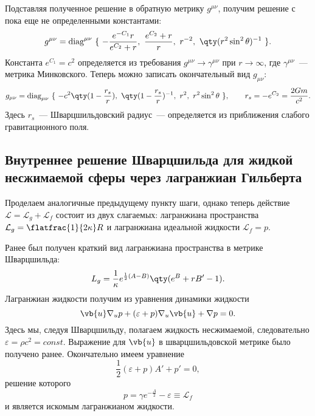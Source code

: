 \documentclass[\docroot/reports/draft/report.tex]{subfiles}
\begin{document}
    Подставляя полученное решение в обратную метрику $g^{\mu\nu}$, получим решение с пока еще не определенными константами:
    \begin{equation*}
        g^{\mu\nu} = \text{diag}^{\mu\nu}\ \{\
            -\frac{e^{-C_1} r}{e^{C_2} + r},\
            \frac{e^{C_2} + r}{r},\
            r^{-2},\
            \qty(r^2 \sin^2\theta)^{-1}
        \ \} .
    \end{equation*}
    Константа $e^{C_1} = c^2$ определяется из требования $g^{\mu\nu} \to \gamma^{\mu\nu}$ при $r \to \infty$, где $\gamma^{\mu\nu}$~--- метрика Минковского. Теперь можно записать окончательный вид $g_{\mu\nu}$:
    \begin{equation*}
        g_{\mu\nu} = \text{diag}_{\mu\nu}\ \{\
            - c^2 \qty(1 - \frac{r_s}{r}),\
            \qty(1 - \frac{r_s}{r})^{-1},\
            r^2,\
            r^2 \sin^2\theta
        \ \} , \qquad r_s = - e^{C_2} = \frac{2 G m}{c^2} .
    \end{equation*}
    Здесь $r_s$~--- Шварцшильдовский радиус~--- определяется из приближения слабого гравитационного поля.

\subsection{Внутреннее решение Шварцшильда для жидкой несжимаемой сферы через лагранжиан Гильберта}

    Проделаем аналогичные предыдущему пункту шаги, однако теперь действие $\mathcal{L} = \mathcal{L}_g + \mathcal{L}_f$ состоит из двух слагаемых: лагранжиана пространства $\mathcal{L}_g = \flatfrac{1}{2 \kappa} R$ и лагранжиана идеальной жидкости $\mathcal{L}_f = p$.

    Ранее был получен краткий вид лагранжиана пространства в метрике Шварцшильда:
    \begin{equation*}
        L_g = \frac{1}{\kappa} e^{\frac{1}{2} (A - B)} \qty(e^B + r B' - 1) .
    \end{equation*}
    Лагранжиан жидкости получим из уравнения динамики жидкости
    \begin{equation*}
        \vb{u} \nabla_u p + (\varepsilon + p) \nabla_u \vb{u} + \nabla p = 0 .
    \end{equation*}
    Здесь мы, следуя Шварцшильду, полагаем жидкость несжимаемой, следовательно $\varepsilon = \rho c^2 = const$.
    Выражение для $\vb{u}$ в шварцшильдовской метрике было получено ранее. Окончательно имеем уравнение
    \begin{equation*}
        \frac{1}{2} (\varepsilon + p) A' + p' = 0 ,
    \end{equation*}
    решение которого
    \begin{equation*}
        p = \gamma e^{-\frac{A}{2}} - \varepsilon \equiv \mathcal{L}_f
    \end{equation*}
    и является искомым лагранжианом жидкости.
\end{document}
